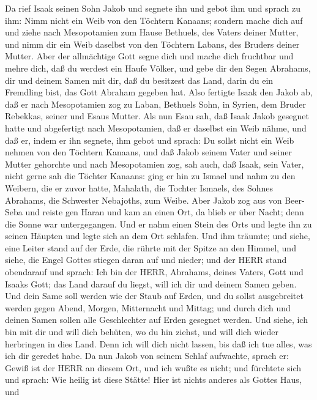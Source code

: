  Da rief Isaak seinen Sohn Jakob und segnete ihn und gebot
ihm und sprach zu ihm: Nimm nicht ein Weib von den Töchtern Kanaans;
 sondern mache dich auf und ziehe nach Mesopotamien zum
Hause Bethuels, des Vaters deiner Mutter, und nimm dir ein Weib daselbst
von den Töchtern Labans, des Bruders deiner Mutter.  Aber
der allmächtige Gott segne dich und mache dich fruchtbar und mehre dich,
daß du werdest ein Haufe Völker,  und gebe dir den Segen
Abrahams, dir und deinem Samen mit dir, daß du besitzest das Land, darin
du ein Fremdling bist, das Gott Abraham gegeben hat.  Also
fertigte Isaak den Jakob ab, daß er nach Mesopotamien zog zu Laban,
Bethuels Sohn, in Syrien, dem Bruder Rebekkas, seiner und Esaus Mutter.
 Als nun Esau sah, daß Isaak Jakob gesegnet hatte und
abgefertigt nach Mesopotamien, daß er daselbst ein Weib nähme, und daß
er, indem er ihn segnete, ihm gebot und sprach: Du sollst nicht ein Weib
nehmen von den Töchtern Kanaans,  und daß Jakob seinem Vater
und seiner Mutter gehorchte und nach Mesopotamien zog,  sah
auch, daß Isaak, sein Vater, nicht gerne sah die Töchter Kanaans:
 ging er hin zu Ismael und nahm zu den Weibern, die er zuvor
hatte, Mahalath, die Tochter Ismaels, des Sohnes Abrahams, die Schwester
Nebajoths, zum Weibe.  Aber Jakob zog aus von Beer-Seba und
reiste gen Haran  und kam an einen Ort, da blieb er über
Nacht; denn die Sonne war untergegangen. Und er nahm einen Stein des
Orts und legte ihn zu seinen Häupten und legte sich an dem Ort schlafen.
 Und ihm träumte; und siehe, eine Leiter stand auf der
Erde, die rührte mit der Spitze an den Himmel, und siehe, die Engel
Gottes stiegen daran auf und nieder;  und der HERR stand
obendarauf und sprach: Ich bin der HERR, Abrahams, deines Vaters, Gott
und Isaaks Gott; das Land darauf du liegst, will ich dir und deinem
Samen geben.  Und dein Same soll werden wie der Staub auf
Erden, und du sollst ausgebreitet werden gegen Abend, Morgen,
Mitternacht und Mittag; und durch dich und deinen Samen sollen alle
Geschlechter auf Erden gesegnet werden.  Und siehe, ich bin
mit dir und will dich behüten, wo du hin ziehst, und will dich wieder
herbringen in dies Land. Denn ich will dich nicht lassen, bis daß ich
tue alles, was ich dir geredet habe.  Da nun Jakob von
seinem Schlaf aufwachte, sprach er: Gewiß ist der HERR an diesem Ort,
und ich wußte es nicht;  und fürchtete sich und sprach: Wie
heilig ist diese Stätte! Hier ist nichts anderes als Gottes Haus, und
